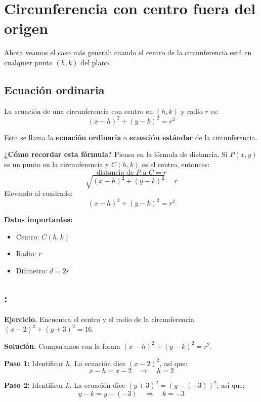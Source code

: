 \documentclass[12pt,a4paper]{article}
\begin{document}
	\section{Circunferencia con centro fuera del origen}

	Ahora veamos el caso más general: cuando el centro de la circunferencia está en cualquier punto $(h,k)$ del plano.

	\subsection*{Ecuación ordinaria}

	La ecuación de una circunferencia con centro en $(h,k)$ y radio $r$ es:
	\[
	\boxed{(x-h)^2+(y-k)^2=r^2}
	\]

	Esta se llama la \textbf{ecuación ordinaria} o \textbf{ecuación estándar} de la circunferencia.

	\bigskip

	\textbf{¿Cómo recordar esta fórmula?} Piensa en la fórmula de distancia. Si $P(x,y)$ es un punto en la circunferencia y $C(h,k)$ es el centro, entonces:
	\[
	\text{distancia de }P\text{ a }C = r
	\]
	\[
	\sqrt{(x-h)^2+(y-k)^2}=r
	\]
	Elevando al cuadrado:
	\[
	(x-h)^2+(y-k)^2=r^2
	\]

	\bigskip

	\textbf{Datos importantes:}
	\begin{itemize}
		\item Centro: $C(h,k)$
		\item Radio: $r$
		\item Diámetro: $d=2r$
	\end{itemize}

	\subsection*{{\color{blue!40!red}{Ejemplo 3}}: \color{blue!80!black}{Circunferencia con centro fuera del origen}}

	\textbf{Ejercicio.} Encuentra el centro y el radio de la circunferencia $(x-2)^2+(y+3)^2=16$.

	\bigskip

	\textbf{Solución.} Comparamos con la forma $(x-h)^2+(y-k)^2=r^2$.

	\bigskip

	\textbf{Paso 1:} Identificar $h$. La ecuación dice $(x-2)^2$, así que:
	\[
	x-h=x-2 \quad\Rightarrow\quad h=2
	\]

	\textbf{Paso 2:} Identificar $k$. La ecuación dice $(y+3)^2=(y-(-3))^2$, así que:
	\[
	y-k=y-(-3) \quad\Rightarrow\quad k=-3
	\]
\end{document}
